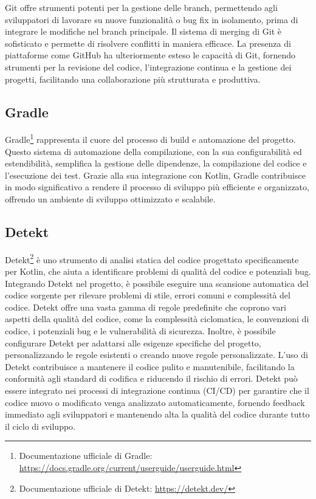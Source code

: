 \documentclass[12pt,a4paper,openright,twoside]{book}
\begin{document}
Git offre strumenti potenti per la gestione delle branch, permettendo agli sviluppatori di lavorare su nuove funzionalità o bug fix in isolamento, prima di integrare 
le modifiche nel branch principale. Il sistema di merging di Git è sofisticato e permette di risolvere conflitti in maniera efficace. La presenza di piattaforme come GitHub 
ha ulteriormente esteso le capacità di Git, fornendo strumenti per la revisione del codice, l'integrazione continua e la gestione dei progetti, facilitando una collaborazione 
più strutturata e produttiva.

\subsection{Gradle}

Gradle\footnote{
    Documentazione ufficiale di Gradle: \url{https://docs.gradle.org/current/userguide/userguide.html}
} rappresenta il cuore del processo di build e automazione del progetto. Questo sistema di automazione della compilazione, con la sua configurabilità ed estendibilità, 
semplifica la gestione delle dipendenze, la compilazione del codice e l'esecuzione dei test. Grazie alla sua integrazione con Kotlin, Gradle contribuisce in modo significativo 
a rendere il processo di sviluppo più efficiente e organizzato, offrendo un ambiente di sviluppo ottimizzato e scalabile.

\subsection{Detekt}
Detekt\footnote{
    Documentazione ufficiale di Detekt: \url{https://detekt.dev/}
} è uno strumento di analisi statica del codice progettato specificamente per Kotlin, che aiuta a identificare problemi di qualità del codice e potenziali bug. 
Integrando Detekt nel progetto, è possibile eseguire una scansione automatica del codice sorgente per rilevare problemi di stile, errori comuni e complessità del codice.
Detekt offre una vasta gamma di regole predefinite che coprono vari aspetti della qualità del codice, come la complessità ciclomatica, le convenzioni di codice, i potenziali 
bug e le vulnerabilità di sicurezza. Inoltre, è possibile configurare Detekt per adattarsi alle esigenze specifiche del progetto, personalizzando le regole esistenti o creando 
nuove regole personalizzate.
L'uso di Detekt contribuisce a mantenere il codice pulito e manutenibile, facilitando la conformità agli standard di codifica e riducendo il rischio di errori. 
Detekt può essere integrato nei processi di integrazione continua (\ac{CI/CD}) per garantire che il codice nuovo o modificato venga analizzato automaticamente, fornendo feedback 
immediato agli sviluppatori e mantenendo alta la qualità del codice durante tutto il ciclo di sviluppo.
\end{document}
